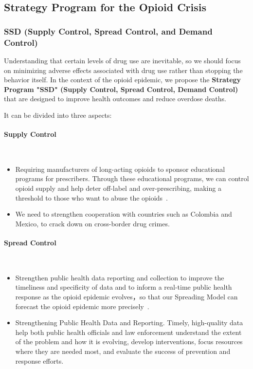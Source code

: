 \documentclass{mcmthesis}
\begin{document}
\subsection{Strategy Program for the Opioid Crisis}\label{Sec:Strategy}

\subsubsection{SSD (Supply Control, Spread Control, and Demand Control) }
	
	Understanding that certain levels of drug use are inevitable, so we should focus on minimizing adverse effects associated with drug use rather than stopping the behavior itself. In the context of the opioid epidemic, we propose the \textbf{Strategy Program "SSD" (Supply Control, Spread Control, Demand Control)} that are designed to improve health outcomes and reduce overdose deaths.
	
    It can be divided into three aspects:
\paragraph{\textbf{Supply Control}}

~\smallskip

\begin{itemize}
    \item Requiring manufacturers of long-acting opioids to sponsor educational programs for prescribers. Through these educational programs, we can control opioid supply and help deter off-label and over-prescribing, making a threshold to those who want to abuse the opioids~\cite{FUSTER2018487}.
    \item We need to strengthen cooperation with countries such as Colombia and Mexico, to crack down on cross-border drug crimes.
\end{itemize}

\paragraph{\textbf{Spread Control}}

~\smallskip

\begin{itemize}
    \item Strengthen public health data reporting and collection to improve the timeliness and specificity of data and to inform a real-time public health response as the opioid epidemic evolves，so that our Spreading Model can forecast the opioid epidemic more precisely~\cite{AWSARE2019}.
    \item Strengthening Public Health Data and Reporting. Timely, high-quality data help both public health officials and law enforcement understand the extent of the problem and how it is evolving, develop interventions, focus resources where they are needed most, and evaluate the success of prevention and response efforts. 
\end{itemize}
\end{document}
